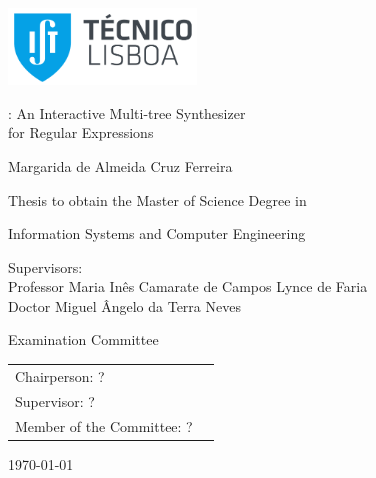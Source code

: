 \thispagestyle {empty}

\includegraphics[width=5cm]{pictures/IST_A.pdf}

\begin{center}

\vspace{2.5cm}
\vspace{1.0cm}
{\FontLb \Forest: An Interactive Multi-tree Synthesizer\\for Regular Expressions}


\vspace{2.7cm}
{\FontMb Margarida de Almeida Cruz Ferreira}

\vspace{2.0cm}
{\FontSn Thesis to obtain the Master of Science Degree in}

\vspace{0.3cm}
{\FontLb Information Systems and Computer Engineering}

\vspace{1.1cm}
{\FontSn %
	Supervisors:\\
	Professor Maria Inês Camarate de Campos Lynce de Faria\\
	Doctor Miguel Ângelo da Terra Neves

}

\vspace{1.1cm}
{\FontMb Examination Committee} \\

\vspace{0.5cm}
{
\FontSn %
\begin{tabular}{ll}
Chairperson: ? \\
Supervisor: ? \\
Member of the Committee: ? \\
\end{tabular}
}

\vspace{1.5cm}
{\FontMb \monthyeardate\today}

\end{center}

\cleardoublepage

